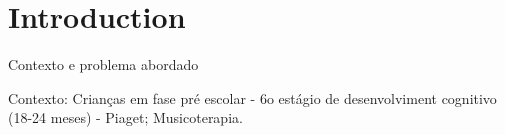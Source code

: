 \section{Introduction}

Contexto e problema abordado


 Contexto: Crianças em fase pré escolar - 6o estágio de desenvolviment cognitivo (18-24 meses) - Piaget; Musicoterapia.